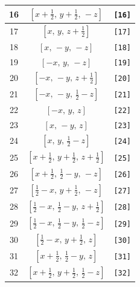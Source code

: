 \documentclass[fleqn,8pt]{jsarticle}
\begin{document}
\begin{longtable}{ccc}
16 & $\left[ x + \frac{1}{2},\, y + \frac{1}{2},\, - z \right]$ & {\tt [16]} \\ \hline
17 & $\left[ x,\, y,\, z + \frac{1}{2} \right]$ & {\tt [17]} \\ \hline
18 & $\left[ x,\, - y,\, - z \right]$ & {\tt [18]} \\ \hline
19 & $\left[ - x,\, y,\, - z \right]$ & {\tt [19]} \\ \hline
20 & $\left[ - x,\, - y,\, z + \frac{1}{2} \right]$ & {\tt [20]} \\ \hline
21 & $\left[ - x,\, - y,\, \frac{1}{2} - z \right]$ & {\tt [21]} \\ \hline
22 & $\left[ - x,\, y,\, z \right]$ & {\tt [22]} \\ \hline
23 & $\left[ x,\, - y,\, z \right]$ & {\tt [23]} \\ \hline
24 & $\left[ x,\, y,\, \frac{1}{2} - z \right]$ & {\tt [24]} \\ \hline
25 & $\left[ x + \frac{1}{2},\, y + \frac{1}{2},\, z + \frac{1}{2} \right]$ & {\tt [25]} \\ \hline
26 & $\left[ x + \frac{1}{2},\, \frac{1}{2} - y,\, - z \right]$ & {\tt [26]} \\ \hline
27 & $\left[ \frac{1}{2} - x,\, y + \frac{1}{2},\, - z \right]$ & {\tt [27]} \\ \hline
28 & $\left[ \frac{1}{2} - x,\, \frac{1}{2} - y,\, z + \frac{1}{2} \right]$ & {\tt [28]} \\ \hline
29 & $\left[ \frac{1}{2} - x,\, \frac{1}{2} - y,\, \frac{1}{2} - z \right]$ & {\tt [29]} \\ \hline
30 & $\left[ \frac{1}{2} - x,\, y + \frac{1}{2},\, z \right]$ & {\tt [30]} \\ \hline
31 & $\left[ x + \frac{1}{2},\, \frac{1}{2} - y,\, z \right]$ & {\tt [31]} \\ \hline
32 & $\left[ x + \frac{1}{2},\, y + \frac{1}{2},\, \frac{1}{2} - z \right]$ & {\tt [32]} \\
\end{longtable}
\end{document}
